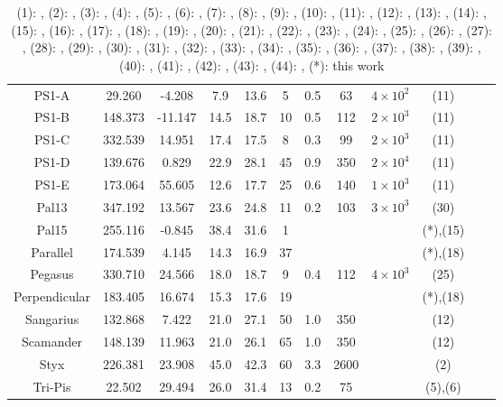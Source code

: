 \begin{table}
\begin{tabular}{cSSSScSccccc}
PS1-A & 29.260 & -4.208 & 7.9 & 13.6 & 5 & 0.5 & 63 & $4 \times 10^{2}$ & (11) \\
PS1-B & 148.373 & -11.147 & 14.5 & 18.7 & 10 & 0.5 & 112 & $2 \times 10^{3}$ & (11) \\
PS1-C & 332.539 & 14.951 & 17.4 & 17.5 & 8 & 0.3 & 99 & $2 \times 10^{3}$ & (11) \\
PS1-D & 139.676 & 0.829 & 22.9 & 28.1 & 45 & 0.9 & 350 & $2 \times 10^{4}$ & (11) \\
PS1-E & 173.064 & 55.605 & 12.6 & 17.7 & 25 & 0.6 & 140 & $1 \times 10^{3}$ & (11) \\
Pal13 & 347.192 & 13.567 & 23.6 & 24.8 & 11 & 0.2 & 103 & $3 \times 10^{3}$ & (30) \\
Pal15 & 255.116 & -0.845 & 38.4 & 31.6 & 1 & & & & (*),(15) \\
Parallel & 174.539 & 4.145 & 14.3 & 16.9 & 37 & & & & (*),(18) \\
Pegasus & 330.710 & 24.566 & 18.0 & 18.7 & 9 & 0.4 & 112 & $4 \times 10^{3}$ & (25) \\
Perpendicular & 183.405 & 16.674 & 15.3 & 17.6 & 19 & & & & (*),(18) \\
Sangarius & 132.868 & 7.422 & 21.0 & 27.1 & 50 & 1.0 & 350 & & (12) \\
Scamander & 148.139 & 11.963 & 21.0 & 26.1 & 65 & 1.0 & 350 & & (12) \\
Styx & 226.381 & 23.908 & 45.0 & 42.3 & 60 & 3.3 & 2600 & & (2) \\
Tri-Pis & 22.502 & 29.494 & 26.0 & 31.4 & 13 & 0.2 & 75 & & (5),(6) \\
\hline \hline
\end{tabular}
\caption{
    (1): \citet{odenkirchen:2009}, (2): \citet{grillmair:2009}, (3): \citet{koposov:2010}, (4): \citet{williams:2011}, (5): \citet{bonaca:2012}, (6): \citet{martin:2013}, (7): \citet{grillmair:2013}, (8): \citet{grillmair:2014}, (9): \citet{sesar:2015}, (10): \citet{kuzma:2015}, (11): \citet{bernard:2016}, (12): \citet{grillmair:2017}, (13): \citet{ibata:2017}, (14): \citet{grillmair:2017b}, (15): \citet{myeong:2017}, (16): \citet{shipp:2018}, (17): \citet{fu:2018}, (18): \citet{weiss:2018}, (19): \citet{mateu:2018}, (20): \citet{jethwa:2018}, (21): \citet{malhan:2018}, (22): \citet{ibata:2019}, (23): \citet{shipp:2019}, (24): \citet{malhan:2019}, (25): \citet{perottoni:2019}, (26): \citet{li:2019}, (27): \citet{ibata:2019b}, (28): \citet{caldwell:2020}, (29): \citet{ji:2020}, (30): \citet{shipp:2020}, (31): \citet{bonaca:2020}, (32): \citet{yuan:2020}, (33): \citet{sollima:2020}, (34): \citet{li:2021}, (35): \citet{gialluca:2021}, (36): \citet{sheffield:2021}, (37): \citet{ibata:2021}, (38): \citet{hansen:2021}, (39): \citet{thomas:2022}, (40): \citet{ferguson:2022}, (41): \citet{li:2022}, (42): \citet{koposov:2023}, (43): \citet{ibata:2023}, (44): \citet{usman:2024}, (*): this work
}
\end{table}
